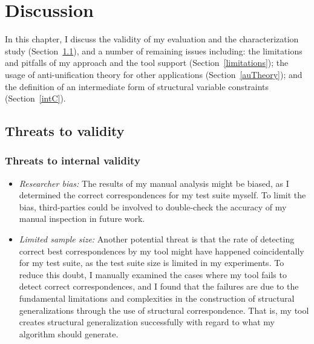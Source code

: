 \chapter{Discussion}  \label{diss}

In this chapter, I discuss the validity of my evaluation and the characterization study (Section~\ref{threats}), and a number of remaining issues including: the limitations and pitfalls of my approach and the tool support (Section~\ref{limitations}); the usage of anti-unification theory for other applications (Section~\ref{auTheory}); and the definition of an intermediate form of structural variable constraints (Section~\ref{intC}).

\section{Threats to validity}  \label{threats}

\subsection{Threats to internal validity}  \label{internal_threats}
\begin{itemize} [leftmargin=.5in]
\item \textit{Researcher bias:} The results of my manual analysis might be biased, as I determined the correct correspondences for my test suite myself. To limit the bias, third-parties could be involved to double-check the accuracy of my manual inspection in future work.
\item \textit{Limited sample size:} Another potential threat is that the rate of detecting correct best correspondences by my tool might have happened coincidentally for my test suite, as the test suite size is limited in my experiments. To reduce this doubt, I manually examined the cases where my tool fails to detect correct correspondences, and I found that the failures are due to the fundamental limitations and complexities in the construction of structural generalizations through the use of structural correspondence. That is, my tool creates structural generalization successfully with regard to what my algorithm should generate.
\end{itemize}

